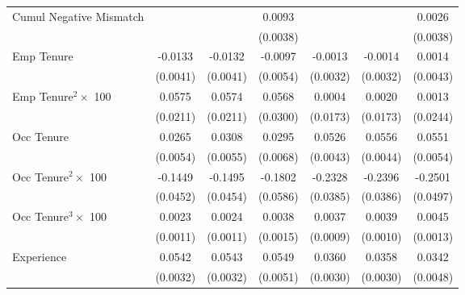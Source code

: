 {\begin{longtable}{l*{6}{c}}
Cumul Negative Mismatch&                     &                     &      0.0093\sym{**} &                     &                     &      0.0026         \\
                    &                     &                     &    (0.0038)         &                     &                     &    (0.0038)         \\
Emp Tenure          &     -0.0133\sym{***}&     -0.0132\sym{***}&     -0.0097\sym{*}  &     -0.0013         &     -0.0014         &      0.0014         \\
                    &    (0.0041)         &    (0.0041)         &    (0.0054)         &    (0.0032)         &    (0.0032)         &    (0.0043)         \\
Emp Tenure$^2\times$ 100&      0.0575\sym{***}&      0.0574\sym{***}&      0.0568\sym{*}  &      0.0004         &      0.0020         &      0.0013         \\
                    &    (0.0211)         &    (0.0211)         &    (0.0300)         &    (0.0173)         &    (0.0173)         &    (0.0244)         \\
Occ Tenure          &      0.0265\sym{***}&      0.0308\sym{***}&      0.0295\sym{***}&      0.0526\sym{***}&      0.0556\sym{***}&      0.0551\sym{***}\\
                    &    (0.0054)         &    (0.0055)         &    (0.0068)         &    (0.0043)         &    (0.0044)         &    (0.0054)         \\
Occ Tenure$^2\times$ 100&     -0.1449\sym{***}&     -0.1495\sym{***}&     -0.1802\sym{***}&     -0.2328\sym{***}&     -0.2396\sym{***}&     -0.2501\sym{***}\\
                    &    (0.0452)         &    (0.0454)         &    (0.0586)         &    (0.0385)         &    (0.0386)         &    (0.0497)         \\
Occ Tenure$^3\times$ 100&      0.0023\sym{**} &      0.0024\sym{**} &      0.0038\sym{**} &      0.0037\sym{***}&      0.0039\sym{***}&      0.0045\sym{***}\\
                    &    (0.0011)         &    (0.0011)         &    (0.0015)         &    (0.0009)         &    (0.0010)         &    (0.0013)         \\
Experience          &      0.0542\sym{***}&      0.0543\sym{***}&      0.0549\sym{***}&      0.0360\sym{***}&      0.0358\sym{***}&      0.0342\sym{***}\\
                    &    (0.0032)         &    (0.0032)         &    (0.0051)         &    (0.0030)         &    (0.0030)         &    (0.0048)         \\

\end{longtable}}
